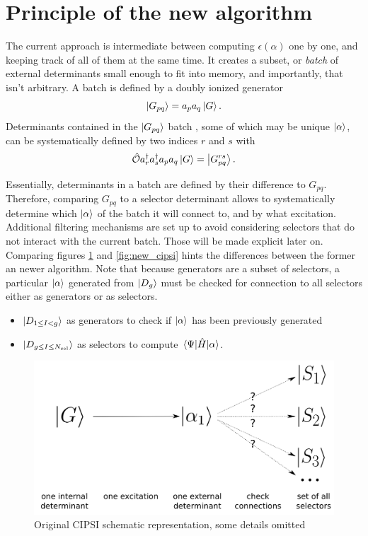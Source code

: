 \documentclass[./thesis.tex]{subfiles}
\begin{document}
\section{Principle of the new algorithm}

The current approach is intermediate between computing $\epsilon(\alpha)$ one by one, and keeping track of all of them at the same time.
It creates a subset, or \emph{batch} of external determinants small enough to fit into memory, and importantly, that isn't arbitrary.
A batch is defined by a doubly ionized generator
\begin{equation}
\ket {G_{pq}} = a_p a_q \ket G.
\end{equation}
Determinants contained in the $\ket {G_{pq}}$ batch , some of which may be unique ${\ket{\alpha}}$, can be systematically defined by two indices $r$ and $s$ with
\begin{equation}
{\hat{\mathcal{O}}} a^\dagger_r a^\dagger_s a_p a_q  \ket G = \ket{G^{rs}_{pq}}.
\end{equation}

Essentially, determinants in a batch are defined by their difference to $G_{pq}$. Therefore, comparing $G_{pq}$ to a selector determinant allows to systematically determine which ${\ket{\alpha}}$ of the batch it will connect to, and by what excitation. Additional filtering mechanisms are set up to avoid considering selectors that do not interact with the current batch. Those will be made explicit later on. Comparing figures \ref{fig:old_cipsi} and \ref{fig:new_cipsi} hints the differences between the former an newer algorithm. Note that because generators are a subset of selectors, a particular ${\ket{\alpha}}$ generated from $\ket {D_g}$ must be checked for connection to all selectors either as generators or as selectors.

\begin{itemize}
\item
$\ket {D_{1 \le I < g}}$ as generators to check if ${\ket{\alpha}}$ has been previously generated
\item
$\ket {D_{g \le I \le {N_\text{sel}}}}$ as selectors to compute $\mel{\Psi}{\hat{H}}{\alpha}$.
\end{itemize}


\begin{figure}[h!]
        \begin{center}
                \includegraphics[width=0.7\columnwidth]{figures/cipsi/old_cipsi}
        \end{center}
        \caption{Original CIPSI schematic representation, some details omitted}
        \label{fig:old_cipsi}
\end{figure}
\end{document}
